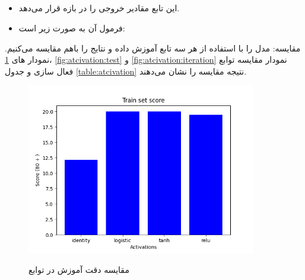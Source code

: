 \documentclass[12pt, dvipsnames, svgnames, x11names,]{article}
\begin{document}
		\subsection{}
		
			\begin{itemize}
				
				\item این تابع مقادیر خروجی را در بازه \lr{[-1, 1]} قرار می‌دهد.
				
				\item فرمول آن به صورت زیر است:

				\begin{center}
				\end{center}
				
			\end{itemize}
			
		
		مقایسه: مدل را با استفاده از هر سه تابع آموزش داده و نتایج را باهم مقایسه می‌کنیم. نمودار های \ref{fig:atcivation:train}، \ref{fig:atcivation:test} و \ref{fig:atcivation:iteration} نمودار مقایسه توابع فعال سازی و جدول \ref{table:atcivation} نتیجه مقایسه را نشان می‌دهند.
			
			
		\begin{figure}
			\begin{center}
				{\includegraphics[width=10cm]{images/06.png}}
			\end{center}
			\caption{مقایسه دقت آموزش در توابع}
			\label{fig:atcivation:train}
		\end{figure}
		
\end{document}
